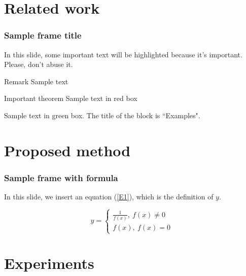 \documentclass[utf8]{beamer}%
\begin{document}
	\section{Related work}
	
	\begin{frame}
		\frametitle{Sample frame title}
		
		In this slide, some important text will be
		\alert{highlighted} because it's important.
		Please, don't abuse it.
		
		\begin{block}{Remark}
			Sample text
		\end{block}
		
		\begin{alertblock}{Important theorem}
			Sample text in red box
		\end{alertblock}
		
		\begin{examples}
			Sample text in green box. The title of the block is ``Examples".
		\end{examples}
	\end{frame}
	
	\section{Proposed method}
	
	\begin{frame}
		\frametitle{Sample frame with formula}
		
		In this slide, we insert an equation (\ref{E1}), which is the definition of $y$.
		
		\begin{equation}
			\label{E1}
			y=
			\begin{cases}
				\frac{1}{f(x)},\ f(x) \neq 0 \\
				f(x), \ f(x)=0
			\end{cases}
		\end{equation}
		
	\end{frame}
	
	
	\section{Experiments}
	
\end{document}
